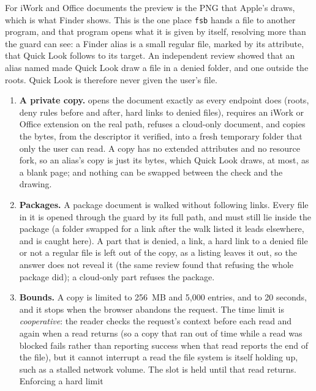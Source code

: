 For iWork and Office documents the preview is the PNG that Apple's 
draws, which is what Finder shows.  This is the one place \texttt{fsb} hands a file to
another program, and that program opens what it is given by itself, resolving more than the
guard can see: a Finder alias is a small regular file, marked by its 
attribute, that Quick Look follows to its target.  An independent review showed that an
alias named  made Quick Look draw a file in a denied folder, and one
outside the roots.  Quick Look is therefore never given the user's file.

\begin{enumerate}
  \item \textbf{A private copy.}   opens the document
        exactly as every endpoint does (roots, deny rules before and after, hard links to
        denied files), requires an iWork or Office extension on the real path, refuses a
        cloud-only document, and copies the bytes, from the descriptor it verified, into a
        fresh temporary folder that only the user can read.  A copy has no extended
        attributes and no resource fork, so an alias's copy is just its bytes, which Quick
        Look draws, at most, as a blank page; and nothing can be swapped between the check
        and the drawing.
  \item \textbf{Packages.}  A package document is walked without following links.  Every
        file in it is opened through the guard by its full path, and must still lie inside
        the package (a folder swapped for a link after the walk listed it leads elsewhere,
        and is caught here).  A part that is denied, a link, a hard link to a denied file or
        not a regular file is left out of the copy, as a listing leaves it out, so the
        answer does not reveal it (the same review found that refusing the whole package
        did); a cloud-only part refuses the package.
  \item \textbf{Bounds.}  A copy is limited to 256~MB and 5{,}000 entries, and to 20
        seconds, and it stops when the browser abandons the request.  The time limit is
        \emph{cooperative}: the reader checks the request's context before each read and
        again when a read returns (so a copy that ran out of time while a read was blocked
        fails rather than reporting success when that read reports the end of the file), but
        it cannot interrupt a read the file system is itself holding up, such as a stalled
        network volume.  The slot is held until that read returns.  Enforcing a hard limit

\end{enumerate}
